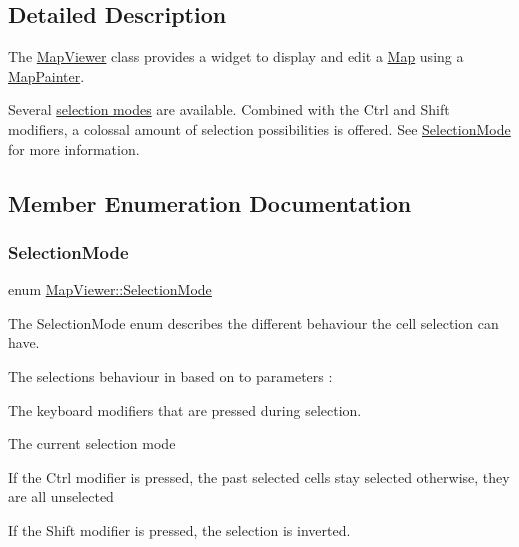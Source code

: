 \subsection{Detailed Description}
The \hyperlink{class_map_viewer}{Map\+Viewer} class provides a widget to display and edit a \hyperlink{class_map}{Map} using a \hyperlink{class_map_painter}{Map\+Painter}. 

Several \hyperlink{class_map_viewer_a8a7a365452e5770c1fab21a9bfb0067d}{selection modes} are available. Combined with the {\ttfamily Ctrl} and {\ttfamily Shift} modifiers, a colossal amount of selection possibilities is offered. See \hyperlink{class_map_viewer_a8a7a365452e5770c1fab21a9bfb0067d}{Selection\+Mode} for more information. 

\subsection{Member Enumeration Documentation}
\hypertarget{class_map_viewer_a8a7a365452e5770c1fab21a9bfb0067d}{}\label{class_map_viewer_a8a7a365452e5770c1fab21a9bfb0067d} 
\subsubsection{\texorpdfstring{Selection\+Mode}{SelectionMode}}
{\footnotesize\ttfamily enum \hyperlink{class_map_viewer_a8a7a365452e5770c1fab21a9bfb0067d}{Map\+Viewer\+::\+Selection\+Mode}}



The Selection\+Mode enum describes the different behaviour the cell selection can have. 

The selection\textquotesingle{}s behaviour in based on to parameters \+:
\begin{DoxyItemize}
\item The keyboard modifiers that are pressed during selection.
\item The current selection mode
\end{DoxyItemize}

If the {\ttfamily Ctrl} modifier is pressed, the past selected cells stay selected otherwise, they are all unselected

If the {\ttfamily Shift} modifier is pressed, the selection is inverted.

